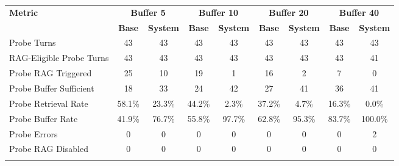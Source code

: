 \begin{landscape}
\begin{longtable}{@{}p{3.8cm}cccccccc@{}}
\toprule
\textbf{Metric} & \multicolumn{2}{c}{\textbf{Buffer 5}} & \multicolumn{2}{c}{\textbf{Buffer 10}} & \multicolumn{2}{c}{\textbf{Buffer 20}} & \multicolumn{2}{c}{\textbf{Buffer 40}} \\
\cmidrule(lr){2-3}\cmidrule(lr){4-5}\cmidrule(lr){6-7}\cmidrule(lr){8-9}
 & \textbf{Base} & \textbf{System} & \textbf{Base} & \textbf{System} & \textbf{Base} & \textbf{System} & \textbf{Base} & \textbf{System} \\
\midrule
\endhead
Probe Turns & 43 & 43 & 43 & 43 & 43 & 43 & 43 & 43 \\
RAG-Eligible Probe Turns & 43 & 43 & 43 & 43 & 43 & 43 & 43 & 41 \\
Probe RAG Triggered & 25 & 10 & 19 & 1 & 16 & 2 & 7 & 0 \\
Probe Buffer Sufficient & 18 & 33 & 24 & 42 & 27 & 41 & 36 & 41 \\
Probe Retrieval Rate & 58.1\% & 23.3\% & 44.2\% & 2.3\% & 37.2\% & 4.7\% & 16.3\% & 0.0\% \\
Probe Buffer Rate & 41.9\% & 76.7\% & 55.8\% & 97.7\% & 62.8\% & 95.3\% & 83.7\% & 100.0\% \\
Probe Errors & 0 & 0 & 0 & 0 & 0 & 0 & 0 & 2 \\
Probe RAG Disabled & 0 & 0 & 0 & 0 & 0 & 0 & 0 & 0 \\
\botrule
\end{longtable}
\normalsize
\end{landscape}

